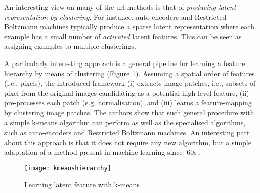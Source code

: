 

An interesting view on many of the \gls{url} methods is that of \textit{producing latent representation by clustering}.
For instance, auto-encoders and Restricted Boltzmann machines typically produce a sparse latent representation where each example has a small number of \textit{activated} latent features.
This can be seen as assigning examples to multiple clusterings. 


A particularly interesting approach is a general pipeline for learning a feature hierarchy by means of clustering \cite{coates2011analysis} (Figure \ref{fig:kmeansh}).
Assuming a spatial order of features (i.e., pixels), the introduced framework (i) extracts image patches, i.e., subsets of pixel from the original images candidating as a potential high-level feature, (ii) pre-processes each patch (e.g. normalisation), and (iii) learns a feature-mapping by clustering image patches.
The authors show that such general procedure with a simple k-means algorithm can perform as well as the specialised algorithms, such as auto-encoders and  Restricted Boltzmann machines.
An interesting part about this approach is that it does not require any new algorithm, but a simple adaptation of a method present in machine learning since '60s \cite{kmeans}.





\begin{figure}
	\medskip
	\centering
	\texttt{[image: kmeanshierarchy]}
	\caption{Learning latent feature with k-means}
	\label{fig:kmeansh}
\end{figure}



